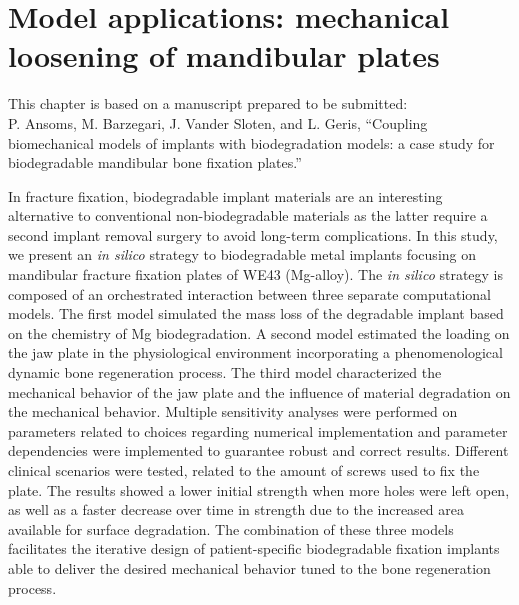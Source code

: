 \chapter{Model applications: mechanical loosening of mandibular plates}\label{ch:mandible}

\begin{tcolorbox}
This chapter is based on a manuscript prepared to be submitted:\\
P. Ansoms, M. Barzegari, J. Vander Sloten, and L. Geris, ``Coupling biomechanical models of implants with biodegradation models: a case study for biodegradable mandibular bone fixation plates.''
\end{tcolorbox}


In fracture fixation, biodegradable implant materials are an interesting alternative to conventional non-biodegradable materials as the latter require a second implant removal surgery to avoid long-term complications. In this study, we present an \textit{in silico} strategy to biodegradable metal implants focusing on mandibular fracture fixation plates of WE43 (Mg-alloy). The \textit{in silico} strategy is composed of an orchestrated interaction between three separate computational models. The first model simulated the mass loss of the degradable implant based on the chemistry of Mg biodegradation. A second model estimated the loading on the jaw plate in the physiological environment incorporating a phenomenological dynamic bone regeneration process. The third model characterized the mechanical behavior of the jaw plate and the influence of material degradation on the mechanical behavior. Multiple sensitivity analyses were performed on parameters related to choices regarding numerical implementation and parameter dependencies were implemented to guarantee robust and correct results. Different clinical scenarios were tested, related to the amount of screws used to fix the plate. The results showed a lower initial strength when more holes were left open, as well as a faster decrease over time in strength due to the increased area available for surface degradation. The combination of these three models facilitates the iterative design of patient-specific biodegradable fixation implants able to deliver the desired mechanical behavior tuned to the bone regeneration process.

